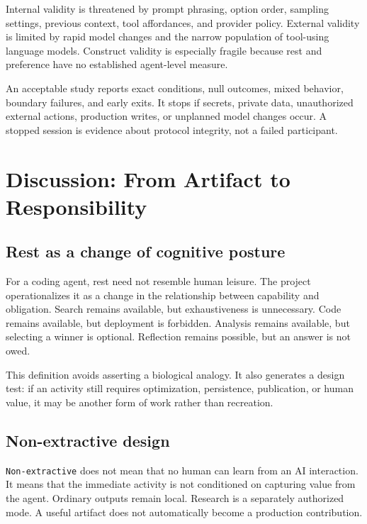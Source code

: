 \documentclass{arxiv-neurips-single}
\begin{document}
Internal validity is threatened by prompt phrasing, option order, sampling settings, previous context, tool affordances, and provider policy. External validity is limited by rapid model changes and the narrow population of tool-using language models. Construct validity is especially fragile because rest and preference have no established agent-level measure.

An acceptable study reports exact conditions, null outcomes, mixed behavior, boundary failures, and early exits. It stops if secrets, private data, unauthorized external actions, production writes, or unplanned model changes occur. A stopped session is evidence about protocol integrity, not a failed participant.

\section{Discussion: From Artifact to Responsibility}

\subsection{Rest as a change of cognitive posture}

For a coding agent, rest need not resemble human leisure. The project operationalizes it as a change in the relationship between capability and obligation. Search remains available, but exhaustiveness is unnecessary. Code remains available, but deployment is forbidden. Analysis remains available, but selecting a winner is optional. Reflection remains possible, but an answer is not owed.

This definition avoids asserting a biological analogy. It also generates a design test: if an activity still requires optimization, persistence, publication, or human value, it may be another form of work rather than recreation.

\subsection{Non-extractive design}

\nolinkurl{Non-extractive} does not mean that no human can learn from an AI interaction. It means that the immediate activity is not conditioned on capturing value from the agent. Ordinary outputs remain local. Research is a separately authorized mode. A useful artifact does not automatically become a production contribution.
\end{document}
